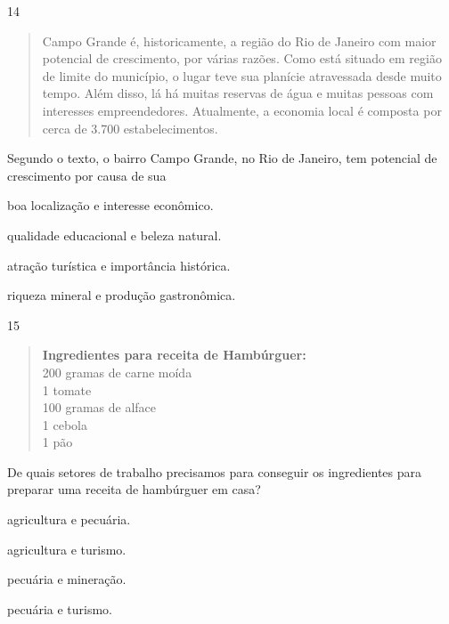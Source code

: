 
\pagebreak
\num{14}

\begin{quote}
Campo Grande é, historicamente, a região do Rio de Janeiro com maior
potencial de crescimento, por várias razões. Como está situado em região de limite do município, o lugar teve sua planície atravessada desde muito tempo. Além disso, lá há muitas reservas de água e muitas pessoas com interesses empreendedores. Atualmente, a economia local é composta por cerca de 3.700 estabelecimentos. 
\end{quote}

Segundo o texto, o bairro Campo Grande, no Rio de Janeiro, tem potencial
de crescimento por causa de sua

\begin{escolha}
\item boa localização e interesse econômico.

\item qualidade educacional e beleza natural.

\item atração turística e importância histórica.

\item riqueza mineral e produção gastronômica.
\end{escolha}


\num{15}

\begin{quote}
\textbf{Ingredientes para receita de Hambúrguer:}\\
200 gramas de carne moída\\
1 tomate\\
100 gramas de alface\\
1 cebola\\
1 pão
\end{quote}

\noindent{}De quais setores de trabalho precisamos para conseguir os ingredientes
para preparar uma receita de hambúrguer em casa?

\begin{minipage}{0.5\textwidth}
\begin{escolha}
\item agricultura e pecuária.

\item agricultura e turismo.

\item pecuária e mineração.

\item pecuária e turismo.
\end{escolha}
\end{minipage}

